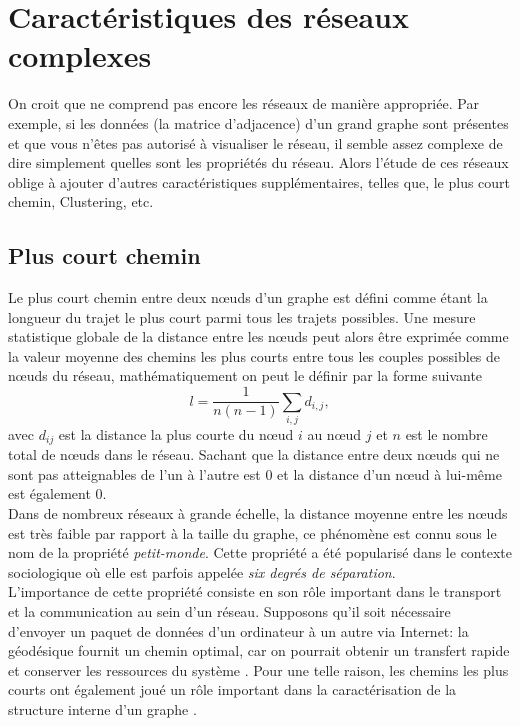\section{Caractéristiques des réseaux complexes}

On croit que ne comprend pas encore les réseaux de manière appropriée. Par exemple, si les données (la matrice d'adjacence) d'un grand graphe sont présentes et que vous n'êtes pas autorisé à visualiser le réseau,
il semble assez complexe de dire simplement quelles sont les propriétés du réseau. Alors
l'étude de ces réseaux oblige à ajouter d'autres caractéristiques supplémentaires, telles que, le plus court chemin,
Clustering, etc.
   \subsection{Plus court chemin}
   
   Le plus court chemin entre deux nœuds d'un graphe est défini comme étant la longueur du trajet le plus court parmi tous les trajets possibles. Une
   mesure statistique globale de la distance entre les nœuds peut alors être exprimée comme la valeur moyenne des chemins les
   plus courts entre tous les couples possibles de nœuds du réseau, mathématiquement on peut le définir par la forme suivante
   \begin{equation}
    l=\frac{1}{n(n-1)}\sum_{i,j} d_{i,j},
   \end{equation}
   avec $d_{ij}$ est la distance la plus courte du nœud $i$ au nœud $j$ et $n$ est le nombre total de nœuds dans le réseau. Sachant que la distance entre deux nœuds qui ne sont pas atteignables de l'un à l'autre est $0$  et la distance d'un nœud à lui-même est également $0$.\\
   Dans de nombreux réseaux à grande échelle, la distance moyenne entre les nœuds est très faible par rapport à la taille du graphe, ce phénomène est connu sous le nom de la propriété \textit{petit-monde}. Cette propriété a été popularisé dans le contexte sociologique où elle est parfois appelée \textit{six degrés de séparation}\cite{Mi1967}.\\
   L'importance de cette propriété consiste en son rôle important dans le transport et la communication au sein d'un réseau. Supposons qu'il soit nécessaire d'envoyer un paquet de données d'un ordinateur à un autre via Internet: la géodésique fournit un chemin  optimal, car on pourrait obtenir un transfert rapide et conserver les ressources du système \cite{PV2004}. Pour une telle raison, les chemins les plus courts ont également joué un rôle important dans la caractérisation de la structure interne d'un graphe \cite{Wa1994,JS2000,Bo-al2006}.

